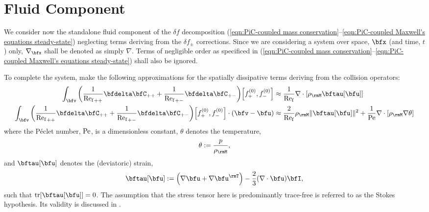 \chapter{Fluid Component}
    
    We consider now the standalone fluid component of the $\delta\!f$ decomposition (\ref{eqn:PiC-coupled mass conservation}--\ref{eqn:PiC-coupled Maxwell's equations steady-state}) neglecting terms deriving from the $\delta\!f_{\pm}$ corrections. Since we are considering a system over space, $\bfx$ (and time, $t$) only, $\nabla_{\bfx}$ shall be denoted as simply $\nabla$. Terms of negligible order as specificed in (\ref{eqn:PiC-coupled mass conservation}--\ref{eqn:PiC-coupled Maxwell's equations steady-state}) shall also be ignored.
    
    To complete the system, make the following approximations for the spatially dissipative terms deriving from the collision operators:
    \begin{align}
        \int_{\bfv}\left(\frac{1}{{\rmRef}_{++}}\bfdelta\bfC_{++} + \frac{1}{{\rmRef}_{+-}}\bfdelta\bfC_{+-}\right)\!\left[f_{+}^{(0)}, f_{-}^{(0)}\right]                    &\approx  \frac{1}{\rmRef}\nabla\cdot[\rho_{\rmM}\bftau[\bfu]]  \\
        \int_{\bfv}\left(\frac{1}{{\rmRef}_{++}}\bfdelta\bfC_{++} + \frac{1}{{\rmRef}_{+-}}\bfdelta\bfC_{+-}\right)\!\left[f_{+}^{(0)}, f_{-}^{(0)}\right]\cdot(\bfv - \bfu)  &\approx  \frac{2}{\rmRef}\rho_{\rmM}\|\bftau[\bfu]\|^{2} + \frac{1}{\rmPe}\nabla\cdot[\rho_{\rmM}\nabla\theta]
    \end{align}
    where the Péclet number, $\mathrm{Pe}$, is a dimensionless constant, $\theta$ denotes the temperature,
    \begin{equation}
        \theta  :=  \frac{p}{\rho_{\rmM}},
    \end{equation}
    and $\bftau[\bfu]$ denotes the (deviatoric) strain,
    \begin{equation}\label{eqn:strain equation}
        \bftau[\bfu]  :=  \left(\nabla\bfu + \nabla\bfu^{\rmT}\right) - \frac{2}{3}(\nabla\cdot\bfu)\bfI,
    \end{equation}
    such that $\tr[\bftau[\bfu]]  =  0$. The assumption that the stress tensor here is predominantly trace-free is referred to as the Stokes hypothesis. \cite{Stokes_1845} Its validity is discussed in \cite{Vincenti_Kruger_1975}.


